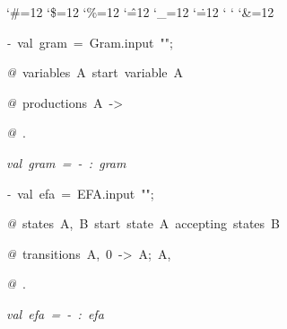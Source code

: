 \begin{list}{}
{\setlength{\leftmargin}{\leftmargini}
\setlength{\rightmargin}{0cm}
\setlength{\itemindent}{0cm}
\setlength{\listparindent}{0cm}
\setlength{\itemsep}{0cm}
\setlength{\parsep}{0cm}
\setlength{\labelsep}{0cm}
\setlength{\labelwidth}{0cm}
\catcode`\#=12
\catcode`\$=12
\catcode`\%=12
\catcode`\^=12
\catcode`\_=12
\catcode`\.=12
\catcode`
\catcode`
\catcode`\&=12
\ttfamily}
\small
\item[]\textsl{-\ }val\ gram\ =\ Gram.input\ "";
\item[]\textsl{@\ }variables\ A\ start\ variable\ A
\item[]\textsl{@\ }productions\ A\ ->\ %
\item[]\textsl{@\ }.
\item[]\textsl{val\ gram\ =\ -\ :\ gram}
\item[]\textsl{-\ }val\ efa\ =\ EFA.input\ "";
\item[]\textsl{@\ }states\ A,\ B\ start\ state\ A\ accepting\ states\ B
\item[]\textsl{@\ }transitions\ A,\ 0\ ->\ A;\ A,\ %
\item[]\textsl{@\ }.
\item[]\textsl{val\ efa\ =\ -\ :\ efa}
\end{list}
